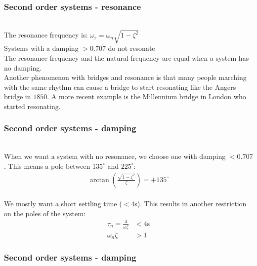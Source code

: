 \begin{frame}
\frametitle{Second order systems - resonance}
\\ The resonance frequency is: $\omega_r = \omega_n\sqrt{1-\zeta^2}$
\vspace{0.35cm}
\pause
\\ Systems with a damping $>0.707$ do not resonate
\vspace{0.35cm}
\pause
\\ The resonance frequency and the natural frequency are equal when a system has no damping.
\vspace{0.35cm}
\pause
\\ Another phenomenon with bridges and resonance is that many people marching with the same rhythm can cause a bridge to start resonating like the Angers bridge in $1850$. A more recent example is the Millennium bridge in London who started resonating.
\end{frame}

\begin{frame}
\frametitle{Second order systems - damping}

\\ When we want a system with no resonance, we choose one with damping $<0.707$. This means a pole between $135^{\circ}$ and $225^{\circ}$:
\\ 
\begin{align*}
\arctan(\frac{\sqrt{1-\zeta^2}}{\zeta}) = +135^{\circ}
\end{align*}
\pause
\\ We mostly want a short settling time ($<4$s). This results in another restriction on the poles of the system: 
\\ \begin{align*}
\tau_n= \frac{4}{\omega\zeta}&< 4\text{s}
\\ \omega_n\zeta&>1
\end{align*}
\end{frame}

\begin{frame}
\frametitle{Second order systems - damping}
\begin{figure}
\end{figure}
\end{frame}


